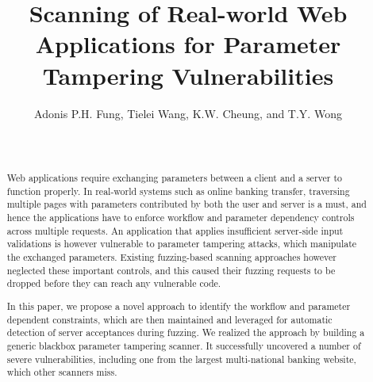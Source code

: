 \documentclass[letter]{sig-alternate-2013}
\begin{document}
\title{Scanning of Real-world Web Applications for Parameter Tampering Vulnerabilities}





\author{
\alignauthor Adonis P.H. Fung{\large \footnotemark[2] }, Tielei Wang{\large \footnotemark[3] }, K.W. Cheung{\large \footnotemark[2] }, and T.Y. Wong{\large \footnotemark[2]}\\
 \\
 \\
}










\maketitle





\begin{abstract}



Web applications require exchanging parameters between a client and a server to function properly. In real-world systems such as online banking transfer, traversing multiple pages with parameters contributed by both the user and server is a must, and hence the applications have to enforce workflow and parameter dependency controls across multiple requests. An application that applies insufficient server-side input validations is however vulnerable to parameter tampering attacks, which manipulate the exchanged parameters. Existing fuzzing-based scanning approaches however neglected these important controls, and this caused their fuzzing requests to be dropped before they can reach any vulnerable code. 

In this paper, we propose a novel approach to identify the workflow and parameter dependent constraints, which are then maintained and leveraged for automatic detection of server acceptances during fuzzing. We realized the approach by building a generic blackbox parameter tampering scanner. It successfully uncovered a number of severe vulnerabilities, including one from the largest multi-national banking website, which other scanners miss.



\end{abstract}
\end{document}
